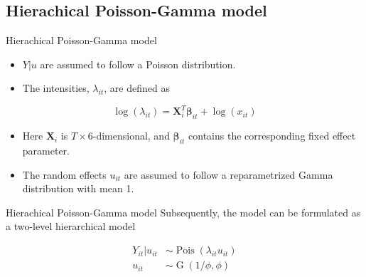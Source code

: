 \documentclass[aspectratio=169]{beamer}
\DeclareMathOperator{\G}{G}
\DeclareMathOperator{\Pois}{Pois}
\begin{document}
\hypertarget{hierachical-poisson-gamma-model}{%
\subsection{Hierachical Poisson-Gamma
model}\label{hierachical-poisson-gamma-model}}

\begin{frame}{Hierachical Poisson-Gamma model}
\begin{itemize}
  \item $Y|u$ are assumed to follow a Poisson distribution. 
  \item The intensities, $\lambda_{it}$, are defined as
\end{itemize}

\begin{equation}
  \log(\lambda_{it})=\mathbf{X}_i^T\mathbf{\beta}_{it}+\log(x_{it})
\end{equation}

\begin{itemize}
  \item Here $\mathbf{X}_i$ is $T\times6$-dimensional, and $\mathbf{\beta}_{it}$ contains the corresponding fixed effect parameter.
  \item The random effects $u_{it}$ are assumed to follow a reparametrized Gamma distribution with mean 1.
\end{itemize}
\end{frame}

\begin{frame}{Hierachical Poisson-Gamma model}
\protect\hypertarget{hierachical-poisson-gamma-model-1}{}
Subsequently, the model can be formulated as a two-level hierarchical
model

\begin{subequations} \label{eq:PoisGam}
  \begin{alignat}{2}
    Y_{it}|u_{it} &\sim \Pois (\lambda_{it}u_{it}) \label{eq:pois_g0} \\ 
    u_{it} &\sim \G(1/\phi,\phi) \label{eq:pois_g1}
  \end{alignat}
\end{subequations}
\end{frame}
\end{document}
